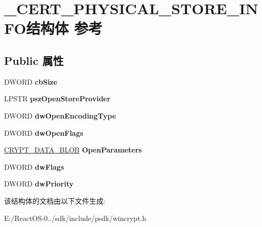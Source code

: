 \hypertarget{struct___c_e_r_t___p_h_y_s_i_c_a_l___s_t_o_r_e___i_n_f_o}{}\section{\+\_\+\+C\+E\+R\+T\+\_\+\+P\+H\+Y\+S\+I\+C\+A\+L\+\_\+\+S\+T\+O\+R\+E\+\_\+\+I\+N\+F\+O结构体 参考}
\label{struct___c_e_r_t___p_h_y_s_i_c_a_l___s_t_o_r_e___i_n_f_o}
\subsection*{Public 属性}
\begin{DoxyCompactItemize}
\item 
\mbox{\label{struct___c_e_r_t___p_h_y_s_i_c_a_l___s_t_o_r_e___i_n_f_o_a6f58bbb00253b0f8881a65bb3ad108c6}} 
D\+W\+O\+RD {\bfseries cb\+Size}
\item 
\mbox{\label{struct___c_e_r_t___p_h_y_s_i_c_a_l___s_t_o_r_e___i_n_f_o_ae8beaf589fecf2804f3988f6eeb51c15}} 
L\+P\+S\+TR {\bfseries psz\+Open\+Store\+Provider}
\item 
\mbox{\label{struct___c_e_r_t___p_h_y_s_i_c_a_l___s_t_o_r_e___i_n_f_o_aae9e994e12a0029352f2614b07a175ab}} 
D\+W\+O\+RD {\bfseries dw\+Open\+Encoding\+Type}
\item 
\mbox{\label{struct___c_e_r_t___p_h_y_s_i_c_a_l___s_t_o_r_e___i_n_f_o_afe7255ae916652f2064edfebc9e01a39}} 
D\+W\+O\+RD {\bfseries dw\+Open\+Flags}
\item 
\mbox{\label{struct___c_e_r_t___p_h_y_s_i_c_a_l___s_t_o_r_e___i_n_f_o_a14f9861f00beea41e674a2c9a1c3e88a}} 
\hyperlink{struct___c_r_y_p_t_o_a_p_i___b_l_o_b}{C\+R\+Y\+P\+T\+\_\+\+D\+A\+T\+A\+\_\+\+B\+L\+OB} {\bfseries Open\+Parameters}
\item 
\mbox{\label{struct___c_e_r_t___p_h_y_s_i_c_a_l___s_t_o_r_e___i_n_f_o_a9a9eb4ea7b5e761844c9ca9186483f8f}} 
D\+W\+O\+RD {\bfseries dw\+Flags}
\item 
\mbox{\label{struct___c_e_r_t___p_h_y_s_i_c_a_l___s_t_o_r_e___i_n_f_o_ae6d1b7f1a415fe6eb18c0528a821fc14}} 
D\+W\+O\+RD {\bfseries dw\+Priority}
\end{DoxyCompactItemize}


该结构体的文档由以下文件生成\+:\begin{DoxyCompactItemize}
\item 
E\+:/\+React\+O\+S-\/0../sdk/include/psdk/wincrypt.\+h\end{DoxyCompactItemize}

